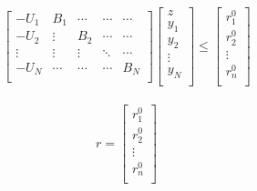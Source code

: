 \documentclass[11pt]{article} %
\begin{document}
\begin{align}  
    \begin{bmatrix}
        -U_{1} & B_{1} & \cdots & \cdots & \cdots\\
        -U_{2} &\vdots  & B_{2} & \cdots & \cdots\\
         \vdots  & \vdots  & \vdots & \ddots  & \cdots\\
        -U_{N} & \cdots  & \cdots & \cdots & B_{N}\\
    \end{bmatrix}
    \begin{bmatrix}
        z\\
        y_1\\
        y_2\\
        \vdots \\
        y_N\\
    \end{bmatrix} \leq
    \begin{bmatrix}
        r_{1}^0\\
        r_{2}^0\\
        \vdots \\
        r_{n}^0\\
    \end{bmatrix}
\end{align}


\begin{align}  
    r = \begin{bmatrix}
        r_{1}^0\\
        r_{2}^0\\
        \vdots \\
        r_{n}^0\\
    \end{bmatrix}
\end{align}
\end{document}
